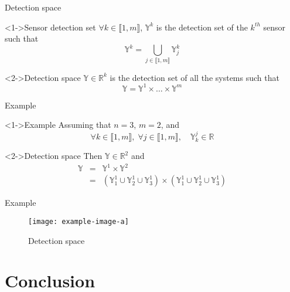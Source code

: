 \documentclass{beamer}
\begin{document}
        \begin{frame}{Detection space}
            \begin{block}<1->{Sensor detection set}
                $\forall k \in \llbracket 1, m\rrbracket$, $\mathbb{Y}^k$ is the detection set of the $k^{th}$ sensor such that
                \begin{equation}
                    \mathbb{Y}^k = \bigcup_{j \in \llbracket 1, m\rrbracket} \mathbb{Y}_j^k
                \end{equation}
            \end{block}
            \begin{block}<2->{Detection space}
                $\mathbb{Y} \in \mathbb{R}^k$ is the detection set of all the systems such that
                \begin{equation}
                    \mathbb{Y} = \mathbb{Y}^1 \times \dots \times \mathbb{Y}^m
                \end{equation}
            \end{block}
        \end{frame}

        \begin{frame}{Example}
            \begin{exampleblock}<1->{Example}
                Assuming that $n = 3$, $m = 2$, and
                $$\forall k \in \llbracket 1, m\rrbracket, \;  \forall j \in \llbracket 1, m\rrbracket, \quad \mathbb{Y}_k^j \in \mathbb{R}$$
            \end{exampleblock}
            \begin{exampleblock}<2->{Detection space}
                Then $\mathbb{Y} \in \mathbb{R}^2$ and
                \begin{eqnarray}
                    \mathbb{Y} & = & \mathbb{Y}^1 \times \mathbb{Y}^2 \\
                    & = & \left(\mathbb{Y}_1^1 \cup \mathbb{Y}_2^1 \cup \mathbb{Y}_3^1\right) \times \left(\mathbb{Y}_1^1 \cup \mathbb{Y}_2^1 \cup \mathbb{Y}_3^1\right)
                \end{eqnarray}
            \end{exampleblock}
        \end{frame}

        \begin{frame}{Example}
            \begin{figure}
                \texttt{[image: example-image-a]}
                \caption{Detection space}
            \end{figure}
        \end{frame}

    \section{Conclusion}
\end{document}
